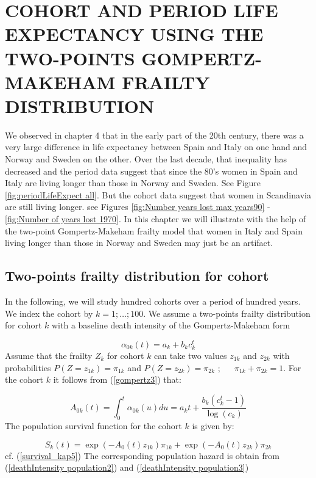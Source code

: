 \chapter{COHORT AND PERIOD LIFE EXPECTANCY USING THE TWO-POINTS GOMPERTZ-MAKEHAM FRAILTY DISTRIBUTION}
\label{sec:sixth}
We observed in chapter 4 that in the early part of the 20th century, there was a very large difference in life expectancy between Spain and Italy on one hand and Norway and Sweden on the other. Over the last decade, that inequality has decreased and the period data suggest that since the 80's women in Spain and Italy are living longer than those in Norway and Sweden. See Figure \ref{fig:periodLifeExpect all}. But the cohort data suggest that women in Scandinavia are still living longer. see Figures \ref{fig:Number years lost max years90} - \ref{fig:Number of years lost 1970}. In this chapter we will illustrate with the help of the two-point Gompertz-Makeham frailty model that women in Italy and Spain living longer than those in Norway and Sweden may just be an artifact.  


\section{Two-points frailty distribution for cohort} 

In the following, we will study hundred cohorts over a period of hundred years. We index the cohort by  $ k=1 ;\dotsc; 100 $.
We assume a two-points frailty distribution for cohort $k$ with a baseline death intensity of the Gompertz-Makeham form

\begin{equation}
    \alpha_{0k}(t) = a_{k} + b_{k}c_{k}^t
    \label{gompertz3}
\end{equation}
Assume that the frailty $Z_{k}$ for cohort $k$ can take two values $z_{1k}$ and $z_{2k}$ with probabilities $P(Z=z_{1k}) = \pi_{1k}$ and $ P(Z=z_{2k}) = \pi_{2k}$ ; ~~ $\pi_{1k} + \pi_{2k} = 1 $.
For the cohort $k$ it follows from (\ref{gompertz3}) that:


\begin{equation*}
         A_{0k}(t) = \int_{0}^{t} \alpha_{0k}(u)du 
                 = a_{k}t + \frac{b_{k}(c_{k}^t-1)}{\log(c_{k})}
 \end{equation*}
The population survival function for the cohort $k$ is given by:


\begin{equation}
  S_{k}(t) = \exp(-A_{0}(t) z_{1k})\pi_{1k} + \exp(-A_{0}(t) z_{2k})\pi_{2k}
\end{equation}
cf. (\ref{survival_kap5})
The corresponding population hazard is obtain from (\ref{deathIntensity population2}) and (\ref{deathIntensity population3})


